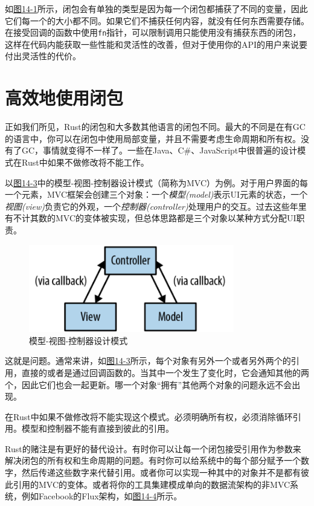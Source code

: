 如\hyperref[f14-1]{图14-1}所示，闭包会有单独的类型是因为每一个闭包都捕获了不同的变量，因此它们每一个的大小都不同。如果它们不捕获任何内容，就没有任何东西需要存储。在接受回调的函数中使用\texttt{fn}指针，可以限制调用只能使用没有捕获东西的闭包，这样在代码内能获取一些性能和灵活性的改善，但对于使用你的API的用户来说要付出灵活性的代价。

\section{高效地使用闭包}

正如我们所见，Rust的闭包和大多数其他语言的闭包不同。最大的不同是在有GC的语言中，你可以在闭包中使用局部变量，并且不需要考虑生命周期和所有权。没有了GC，事情就变得不一样了。一些在Java、C\#、JavaScript中很普遍的设计模式在Rust中如果不做修改将不能工作。

以\hyperref[f14-3]{图14-3}中的模型-视图-控制器设计模式（简称为MVC）为例。对于用户界面的每一个元素，MVC框架会创建三个对象：一个\emph{模型(model)}表示UI元素的状态，一个\emph{视图(view)}负责它的外观，一个\emph{控制器(controller)}处理用户的交互。过去这些年里有不计其数的MVC的变体被实现，但总体思路都是三个对象以某种方式分配UI职责。

\begin{figure}[htbp]
    \centering
    \includegraphics[width=0.8\textwidth]{../img/f14-3.png}
    \caption{模型-视图-控制器设计模式}
    \label{f14-3}
\end{figure}

这就是问题。通常来讲，如\hyperref[f14-3]{图14-3}所示，每个对象有另外一个或者另外两个的引用，直接的或者是通过回调函数的。当其中一个发生了变化时，它会通知其他的两个，因此它们也会一起更新。哪一个对象“拥有”其他两个对象的问题永远不会出现。

在Rust中如果不做修改将不能实现这个模式。必须明确所有权，必须消除循环引用。模型和控制器不能有直接到彼此的引用。

Rust的赌注是有更好的替代设计。有时你可以让每一个闭包接受引用作为参数来解决闭包的所有权和生命周期的问题。有时你可以给系统中的每个部分赋予一个数字，然后传递这些数字来代替引用。或者你可以实现一种其中的对象并不是都有彼此引用的MVC的变体。或者将你的工具集建模成单向的数据流架构的非MVC系统，例如Facebook的Flux架构，如\hyperref[f14-4]{图14-4}所示。


